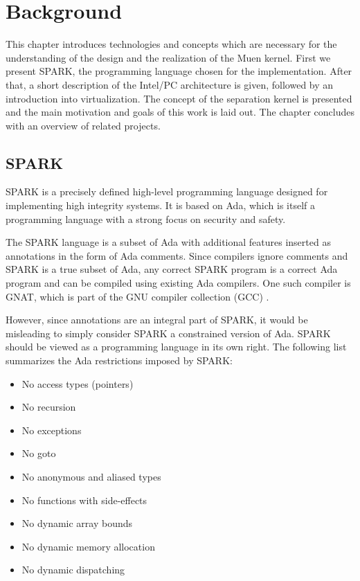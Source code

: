 \chapter{Background}
This chapter introduces technologies and concepts which are necessary for the
understanding of the design and the realization of the Muen kernel.  First we
present SPARK, the programming language chosen for the implementation.  After
that, a short description of the Intel/PC architecture is given, followed by an
introduction into virtualization. The concept of the separation kernel is
presented and the main motivation and goals of this work is laid out. The
chapter concludes with an overview of related projects.

\section{SPARK}\label{sec:spark}
SPARK is a precisely defined high-level programming language designed for
implementing high integrity systems. It is based on Ada, which is itself a
programming language with a strong focus on security and safety.

The SPARK language is a subset of Ada with additional features inserted as
annotations in the form of Ada comments. Since compilers ignore comments and
SPARK is a true subset of Ada, any correct SPARK program is a correct Ada
program and can be compiled using existing Ada compilers. One such compiler is
GNAT, which is part of the GNU compiler collection (GCC) \cite{gcc}.

However, since annotations are an integral part of SPARK, it would be
misleading to simply consider SPARK a constrained version of Ada. SPARK should
be viewed as a programming language in its own right. The following list
summarizes the Ada restrictions imposed by SPARK:

\begin{itemize}
	\item No access types (pointers)
	\item No recursion
	\item No exceptions
	\item No goto
	\item No anonymous and aliased types
	\item No functions with side-effects
	\item No dynamic array bounds
	\item No dynamic memory allocation
	\item No dynamic dispatching
\end{itemize}

